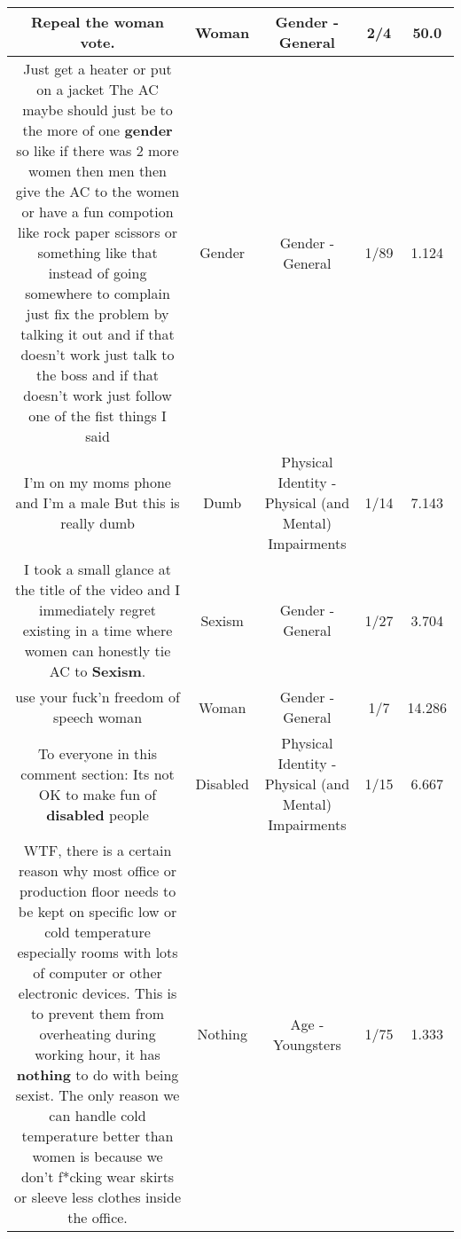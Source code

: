 \documentclass[11pt]{article}
\newlength\mylength
\begin{document}
\begin{center}
\begin{longtable}{|C{.65\mylength}|C{.30\mylength}|C{.12\mylength}|C{.12\mylength}|C{.12\mylength}|}
  \small Repeal the \textbf{woman} vote.\normalsize   & Woman & Gender - General & 2/4 & 50.0 \\  \hline
  \small Just get a heater or put on a jacket   The AC maybe should just be to the more of one \textbf{gender} so like if there was 2 more women then men then give the AC to the women or have a fun compotion like rock paper scissors or something like that instead of going somewhere to complain just fix the problem by talking it out and if that doesn't work just talk to the boss and if that doesn't work just follow one of the fist things I said\normalsize   & Gender & Gender - General & 1/89 & 1.124 \\  \hline
  \small I'm on my moms phone and I'm a male But this is really dumb\normalsize   & Dumb & Physical Identity - Physical (and Mental) Impairments & 1/14 & 7.143 \\  \hline
  \small I took a small glance at the title of the video and I immediately regret existing in a time where women can honestly tie AC to \textbf{Sexism}.\normalsize   & Sexism & Gender - General & 1/27 & 3.704 \\  \hline
  \small use your fuck'n freedom of speech woman\normalsize   & Woman & Gender - General & 1/7 & 14.286 \\  \hline
  \small To everyone in this comment section: Its not OK to make fun of \textbf{disabled} people\normalsize   & Disabled & Physical Identity - Physical (and Mental) Impairments & 1/15 & 6.667 \\  \hline
  \small WTF, there is a certain reason why most office or production floor needs to be kept on specific low or cold temperature especially rooms with lots of computer or other electronic devices. This is to prevent them from overheating during working hour, it has \textbf{nothing} to do with being sexist. The only reason we can handle cold temperature better than women is because we don't f*cking wear skirts or sleeve less clothes inside the office.\normalsize   & Nothing & Age - Youngsters & 1/75 & 1.333 \\  \hline

\end{longtable}
\end{center}
\end{document}
